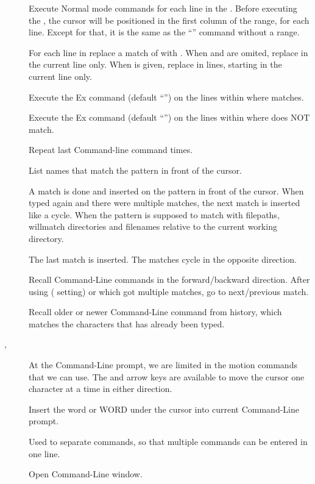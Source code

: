 \begin{description}
  \item[] Execute Normal mode commands  for each line in the . Before executing the , the cursor will be positioned in the first column of the range, for each line. Except for that, it is the same as the ``'' command without a range.

  \item[] For each line in \syntax{[range]} replace a match of  with . When \syntax{[range]} and \syntax{[count]} are omited, replace in the current line only. When \syntax{[count]} is given, replace in \syntax{[count]} lines, starting in the current line only.

  \item[] Execute the Ex command \syntax{[cmd]} (default ``'') on the lines within \syntax{[range]} where  matches.
  \item[] Execute the Ex command \syntax{[cmd]} (default ``'') on the lines within \syntax{[range]} where  does NOT match.
  \item[] Repeat last Command-line command \syntax{[count]} times.

  \item[] List names  that match the pattern in front of the cursor.
  \item[] A match is done and inserted on the pattern in front of the cursor. When typed again and there were multiple matches, the next match is inserted like a cycle. When the pattern is supposed to match with filepaths,  willmatch directories and filenames relative to the current working directory.
  \item[] The last match is inserted. The matches cycle in the opposite direction. 
  \item[] Recall Command-Line commands in the forward\slash backward direction. After using  ( setting) or  which got multiple matches, go to next\slash previous match.
  \item[] Recall older or newer Command-Line command from history, which matches the characters that has already been typed.
  \item[,] At the Command-Line prompt, we are limited in the motion commands that we can use. The  and  arrow keys are available to move the cursor one character at a time in either direction.
  \item[] Insert the word or WORD under the cursor into current Command-Line prompt.
  \item[\syntax{|}] Used to separate commands, so that multiple commands can be entered in one line.
  \item[] Open Command-Line window.


\end{description}
